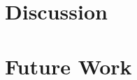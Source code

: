 \documentclass[12pt]{article}
\let\textcite=\autocite
\begin{document}



\section{Discussion}

\section{Future Work}
\end{document}
